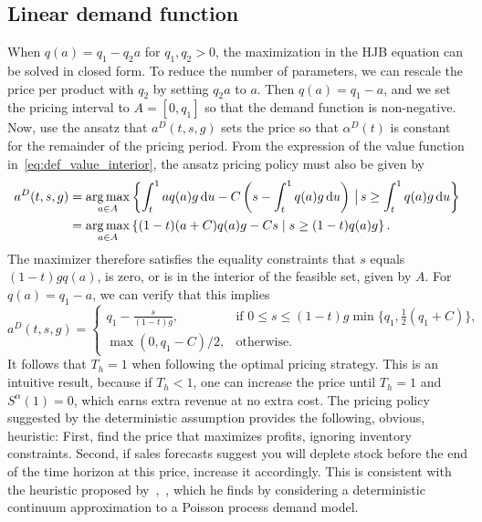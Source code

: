 \documentclass[main.tex]{subfiles}
\begin{document}
\subsection{Linear demand function}
When $q(a)=q_1-q_2a$ for $q_1,q_2>0$, the maximization in the HJB
equation can be solved in closed form.
To reduce the number of parameters, we can rescale the price per
product with $q_2$ by setting $q_2a$ to $a$.
Then $q(a)=q_1-a$, and we set the pricing interval to $A=[0,q_1]$ so that the demand
function is non-negative.
Now, use the ansatz that $a^D(t,s,g)$ sets the price so that
$\alpha^D(t)$ is
constant for the remainder of the pricing period.
From the expression of the value function
in~\eqref{eq:def_value_interior}, the ansatz pricing policy must
also be given by
\begin{align}
  a^D(t,s,g)
  &=\operatorname*{arg\,max}_{a\in A}\left\{\int_t^1aq(a)g\,\mathrm{d}u -
    C\left(s-\int_t^1q(a)g\,\mathrm{d}u\right) \,\big|\,  s \geq \int_t^1q(a)g\,\mathrm{d}u\right\}\\
  &=\operatorname*{arg\,max}_{a\in A}\left\{(1-t)(a+C)q(a)g-Cs \mid  s \geq
    (1-t)q(a)g\right\}.
\end{align}
The maximizer therefore satisfies the equality constraints that
$s$ equals $(1-t)gq(a)$, is zero, or is in the interior of the feasible set,
given by $A$.
For $q(a)=q_1-a$, we can verify that this implies
\begin{equation}\label{eq:astar_linear}
  a^D(t,s,g)=\begin{cases}
    q_1-\frac{s}{(1-t)g}, &\text{if } 0\leq s\leq
    (1-t)g\min\{q_1,\frac{1}{2}(q_1 +C)\},\\
    \max(0,q_1-C)/2,&\text{otherwise.}
  \end{cases}
\end{equation}
It follows that $T_h=1$ when following the optimal pricing strategy.
This is an intuitive result, because if $T_h<1$, one can increase the
price until $T_h=1$ and $S^\alpha(1)=0$, which earns extra revenue at no extra cost.
The pricing policy suggested by the
deterministic assumption provides the following, obvious, heuristic:
First, find the price that maximizes profits, ignoring inventory
constraints. Second, if sales forecasts suggest you will deplete stock
before the end of the time horizon at this price, increase it
accordingly. This is consistent with the heuristic proposed
by~\cite{schlosser2015dynamic1},~\cite{schlosser2015dynamic2}, which
he finds by considering a deterministic continuum
approximation to a Poisson process demand model.
\end{document}
